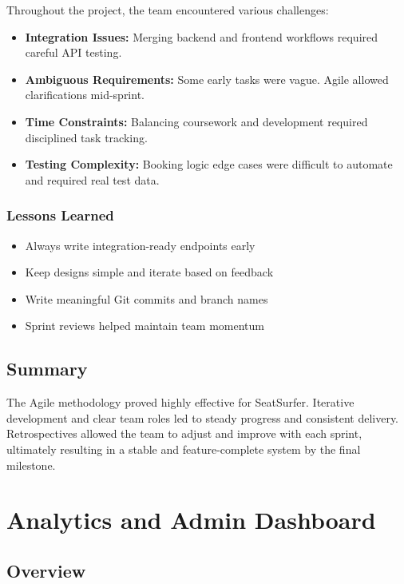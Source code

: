 \documentclass[12pt,a4paper]{report}
\begin{document}
Throughout the project, the team encountered various challenges:

\begin{itemize}
    \item \textbf{Integration Issues:} Merging backend and frontend workflows required careful API testing.
    \item \textbf{Ambiguous Requirements:} Some early tasks were vague. Agile allowed clarifications mid-sprint.
    \item \textbf{Time Constraints:} Balancing coursework and development required disciplined task tracking.
    \item \textbf{Testing Complexity:} Booking logic edge cases were difficult to automate and required real test data.
\end{itemize}

\subsection*{Lessons Learned}

\begin{itemize}
    \item Always write integration-ready endpoints early
    \item Keep designs simple and iterate based on feedback
    \item Write meaningful Git commits and branch names
    \item Sprint reviews helped maintain team momentum
\end{itemize}

\section{Summary}

The Agile methodology proved highly effective for SeatSurfer. Iterative development and clear team roles led to steady progress and consistent delivery. Retrospectives allowed the team to adjust and improve with each sprint, ultimately resulting in a stable and feature-complete system by the final milestone.

\newpage

\chapter{Analytics and Admin Dashboard}

\section{Overview}
\end{document}
